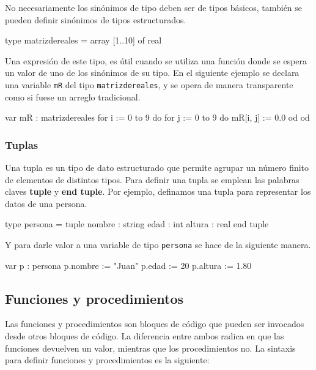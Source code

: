 No necesariamente los sinónimos de tipo deben ser de tipos básicos, también se pueden definir sinónimos de tipos estructurados.

\begin{pascallike}
type matrizdereales = array [1..10] of real
\end{pascallike}

Una expresión de este tipo, es útil cuando se utiliza una función donde se espera un valor de uno de los sinónimos de su tipo. En el siguiente ejemplo se declara una variable \texttt{mR} del tipo \texttt{matrizdereales}, y se opera de manera transparente como si fuese un arreglo tradicional.

\begin{pascallike}
var mR : matrizdereales
for i := 0 to 9 do
    for j := 0 to 9 do
        mR[i, j] := 0.0
    od
od
\end{pascallike}

\subsubsection{Tuplas}
Una tupla es un tipo de dato estructurado que permite agrupar un número finito de elementos de distintos tipos. Para definir una tupla se emplean las palabras claves \textbf{tuple} y \textbf{end tuple}. Por ejemplo, definamos una tupla para representar los datos de una persona.

\begin{pascallike}
type persona = tuple
                nombre : string
                edad : int
                altura : real
                end tuple
\end{pascallike}

Y para darle valor a una variable de tipo \texttt{persona} se hace de la siguiente manera.

\begin{pascallike}
var p : persona
p.nombre := "Juan"
p.edad := 20
p.altura := 1.80
\end{pascallike}

\newpage
\subsection{Funciones y procedimientos}
Las funciones y procedimientos son bloques de código que pueden ser invocados desde otros bloques de código. La diferencia entre ambos radica en que las funciones devuelven un valor, mientras que los procedimientos no. La sintaxis para definir funciones y procedimientos es la siguiente:

